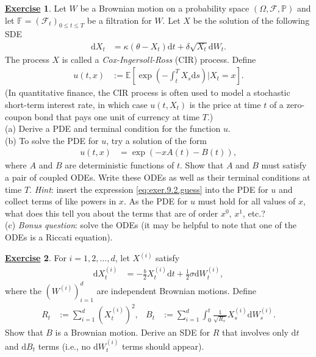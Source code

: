 \documentclass[12pt]{book}
\numberwithin{equation}{chapter}
\theoremstyle{plain}
\numberwithin{theorem}{section}
\theoremstyle{definition}
\newtheorem{exercise}{\underline{Exercise}}
\numberwithin{exercise}{chapter}
\newcommand{\<}{\langle}
\renewcommand{\>}{\rangle}
\renewcommand{\(}{\left(}
\renewcommand{\)}{\right)}
\renewcommand{\[}{\left[}
\renewcommand{\]}{\right]}
\newcommand\Eb{\mathds{E}}
\newcommand\Fb{\mathds{F}}
\newcommand\Pb{\mathds{P}}
\newcommand\Fc{\mathscr{F}}
\newcommand\Om{\Omega}
\newcommand\sig{\sigma}
\newcommand\del{\delta}
\newcommand\dd{\mathrm{d}}
\begin{document}
\begin{exercise}
\label{exer:9.2}
Let $W$ be a Brownian motion on a probability space $(\Om, \Fc, \Pb)$ and let $\Fb = (\Fc_t)_{0 \leq t \leq T}$ be a filtration for $W$.
Let $X$ be the solution of the following SDE
\begin{align}
\dd X_t
	&=	\kappa( \theta - X_t) \dd t + \del \sqrt{X_t} \dd W_t .
\end{align}
The process $X$ is called a \textit{Cox-Ingersoll-Ross} (CIR) process.  Define
\begin{align}
u(t,x)
	&:=	\Eb\[ \exp \( - \int_t^T X_s \dd s \) \Big| X_t = x \] .
\end{align}
(In quantitative finance, the CIR process is often used to model a stochastic short-term interest rate, in which case $u(t,X_t)$ is the price at time $t$ of a zero-coupon bond that pays one unit of currency at time $T$.)
\\[0.5em]
(a) Derive a PDE and terminal condition for the function $u$.\\
(b) To solve the PDE for $u$, try a solution of the form
\begin{align}
u(t,x)
	&=	\exp( -x A(t) - B(t) ) , \label{eq:exer.9.2.guess}
\end{align}
where $A$ and $B$ are deterministic functions of $t$.  Show that $A$ and $B$ must satisfy a pair of coupled ODEs.  Write these ODEs as well as their terminal conditions at time $T$.
\textit{Hint}: insert the expression \eqref{eq:exer.9.2.guess} into the PDE for $u$ and collect terms of like powers in $x$.  As the PDE for $u$ must hold for all values of $x$, what does this tell you about the terms that are of order $x^0$, $x^1$, etc.?\\
(c) \textit{Bonus question}: solve the ODEs (it may be helpful to note that one of the ODEs is a Riccati equation).
\end{exercise}

\begin{exercise}
\label{exer:9.3}
For $i=1,2,\ldots,d$, let $X^{(i)}$ satisfy
\begin{align}
\dd X_t^{(i)}
	&=	-\frac{b}{2} X_t^{(i)} \dd t + \frac{1}{2} \sig \dd W_t^{(i)} ,
\end{align}
where the $(W^{(i)})_{i=1}^d$ are independent Brownian motions.  Define
\begin{align}
R_t
	&:=	\sum_{i=1}^d (X_t^{(i)})^2 , &
B_t
	&:=	\sum_{i=1}^d \int_0^t \frac{1}{\sqrt{R_s}} X_s^{(i)} \dd W_s^{(i)}.
\end{align}
Show that $B$ is a Brownian motion.  Derive an SDE for $R$ that involves only $\dd t$ and $\dd B_t$ terms (i.e., no $\dd W_t^{(i)}$ terms should appear).
\end{exercise}
\end{document}
